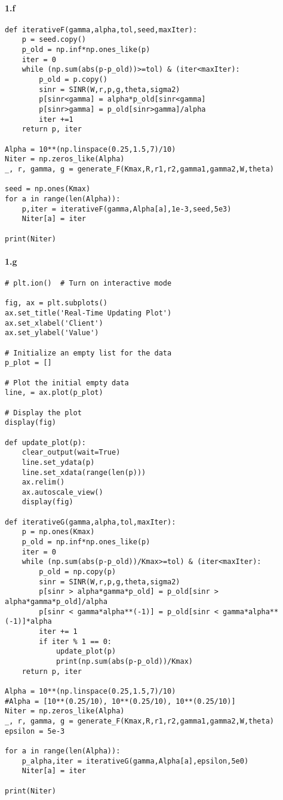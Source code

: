 \documentclass[a4paper,11pt,2]{article}
\begin{document}
\paragraph{1.f}
\begin{center}
\begin{lstlisting}
def iterativeF(gamma,alpha,tol,seed,maxIter):
    p = seed.copy()
    p_old = np.inf*np.ones_like(p)
    iter = 0
    while (np.sum(abs(p-p_old))>=tol) & (iter<maxIter):
        p_old = p.copy()
        sinr = SINR(W,r,p,g,theta,sigma2)
        p[sinr<gamma] = alpha*p_old[sinr<gamma]
        p[sinr>gamma] = p_old[sinr>gamma]/alpha
        iter +=1
    return p, iter

Alpha = 10**(np.linspace(0.25,1.5,7)/10)
Niter = np.zeros_like(Alpha)
_, r, gamma, g = generate_F(Kmax,R,r1,r2,gamma1,gamma2,W,theta)

seed = np.ones(Kmax)
for a in range(len(Alpha)):
    p,iter = iterativeF(gamma,Alpha[a],1e-3,seed,5e3)
    Niter[a] = iter

print(Niter)
\end{lstlisting}
\end{center}

\paragraph{1.g}
\begin{center}
\begin{lstlisting}
# plt.ion()  # Turn on interactive mode

fig, ax = plt.subplots()
ax.set_title('Real-Time Updating Plot')
ax.set_xlabel('Client')
ax.set_ylabel('Value')

# Initialize an empty list for the data
p_plot = []

# Plot the initial empty data
line, = ax.plot(p_plot)

# Display the plot
display(fig)

def update_plot(p):
    clear_output(wait=True)
    line.set_ydata(p)
    line.set_xdata(range(len(p)))
    ax.relim()
    ax.autoscale_view()
    display(fig)

def iterativeG(gamma,alpha,tol,maxIter):
    p = np.ones(Kmax)
    p_old = np.inf*np.ones_like(p)
    iter = 0
    while (np.sum(abs(p-p_old))/Kmax>=tol) & (iter<maxIter):
        p_old = np.copy(p)
        sinr = SINR(W,r,p,g,theta,sigma2)
        p[sinr > alpha*gamma*p_old] = p_old[sinr > alpha*gamma*p_old]/alpha
        p[sinr < gamma*alpha**(-1)] = p_old[sinr < gamma*alpha**(-1)]*alpha
        iter += 1
        if iter % 1 == 0:
            update_plot(p)
            print(np.sum(abs(p-p_old))/Kmax)
    return p, iter

Alpha = 10**(np.linspace(0.25,1.5,7)/10)
#Alpha = [10**(0.25/10), 10**(0.25/10), 10**(0.25/10)]
Niter = np.zeros_like(Alpha)
_, r, gamma, g = generate_F(Kmax,R,r1,r2,gamma1,gamma2,W,theta)
epsilon = 5e-3

for a in range(len(Alpha)):
    p_alpha,iter = iterativeG(gamma,Alpha[a],epsilon,5e0)
    Niter[a] = iter

print(Niter)
\end{lstlisting}
\end{center}
\end{document}
